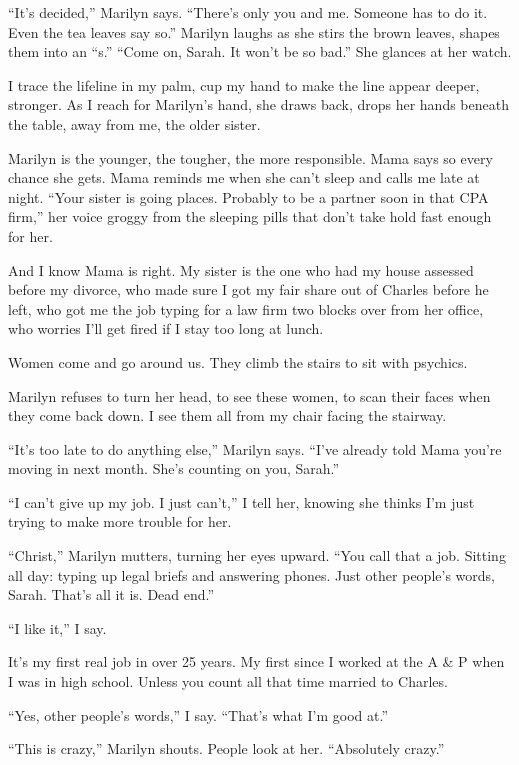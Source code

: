 \documentclass[
]{article}
\begin{document}
``It's decided,'' Marilyn says. ``There's only you and me. Someone has
to do it. Even the tea leaves say so.'' Marilyn laughs as she stirs the
brown leaves, shapes them into an ``s.'' ``Come on, Sarah. It won't be
so bad.'' She glances at her watch.

I trace the lifeline in my palm, cup my hand to make the line appear
deeper, stronger. As I reach for Marilyn's hand, she draws back, drops
her hands beneath the table, away from me, the older sister.

Marilyn is the younger, the tougher, the more responsible. Mama says so
every chance she gets. Mama reminds me when she can't sleep and calls me
late at night. ``Your sister is going places. Probably to be a partner
soon in that CPA firm,'' her voice groggy from the sleeping pills that
don't take hold fast enough for her.

And I know Mama is right. My sister is the one who had my house assessed
before my divorce, who made sure I got my fair share out of Charles
before he left, who got me the job typing for a law firm two blocks over
from her office, who worries I'll get fired if I stay too long at lunch.

Women come and go around us. They climb the stairs to sit with psychics.

Marilyn refuses to turn her head, to see these women, to scan their
faces when they come back down. I see them all from my chair facing the
stairway.

``It's too late to do anything else,'' Marilyn says. ``I've already told
Mama you're moving in next month. She's counting on you, Sarah.''

``I can't give up my job. I just can't,'' I tell her, knowing she thinks
I'm just trying to make more trouble for her.

``Christ,'' Marilyn mutters, turning her eyes upward. ``You call that a
job. Sitting all day: typing up legal briefs and answering phones. Just
other people's words, Sarah. That's all it is. Dead end.''

``I like it,'' I say.

It's my first real job in over 25 years. My first since I worked at the
A \& P when I was in high school. Unless you count all that time married
to Charles.

``Yes, other people's words,'' I say. ``That's what I'm good at.''

``This is crazy,'' Marilyn shouts. People look at her. ``Absolutely
crazy.''
\end{document}
